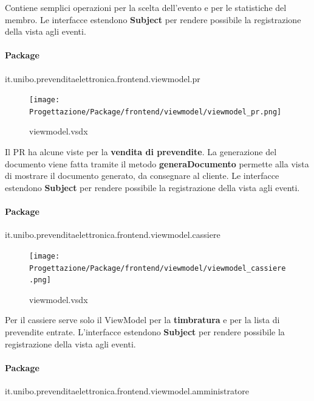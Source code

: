 \documentclass[a4paper]{article}
\begin{document}
Contiene semplici operazioni per la scelta dell'evento e per le statistiche del membro.  Le interfacce estendono \textbf{Subject} per rendere possibile la registrazione della vista agli eventi.

\newpage

\paragraph{Package} it.unibo.prevenditaelettronica.frontend.viewmodel.pr


\begin{figure}[H]
    \texttt{[image: Progettazione/Package/frontend/viewmodel/viewmodel\_pr.png]}
    \centering
    \caption{viewmodel.vsdx}
\end{figure}

Il PR ha alcune viste per la \textbf{vendita di prevendite}. La generazione del documento viene fatta tramite il metodo \textbf{generaDocumento} permette alla vista di mostrare il documento generato, da consegnare al cliente.  Le interfacce estendono \textbf{Subject} per rendere possibile la registrazione della vista agli eventi.

\paragraph{Package} it.unibo.prevenditaelettronica.frontend.viewmodel.cassiere


\begin{figure}[H]
    \texttt{[image: Progettazione/Package/frontend/viewmodel/viewmodel\_cassiere.png]}
    \centering
    \caption{viewmodel.vsdx}
\end{figure}

Per il cassiere serve solo il ViewModel per la \textbf{timbratura} e per la lista di prevendite entrate. L'interfacce estendono \textbf{Subject} per rendere possibile la registrazione della vista agli eventi.

\newpage

\paragraph{Package} it.unibo.prevenditaelettronica.frontend.viewmodel.amministratore

\end{document}
